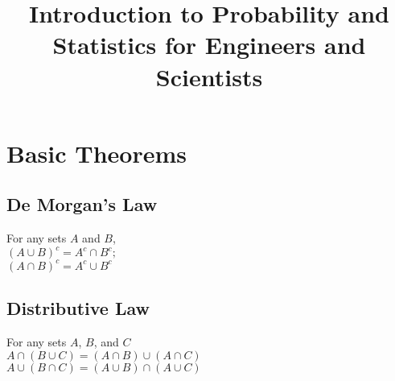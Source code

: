 \documentclass[11pt]{article}
\begin{document}
\title{\textbf{Introduction to Probability and Statistics for Engineers and Scientists}}
\maketitle
\section{Basic Theorems}
\subsection{De Morgan's Law}
\indent For any sets $A$ and $B$, 
\\
$(A\cup B)^c = A^c  \cap B^c; $
\\
$(A \cap B)^c = A^c \cup B^c$
\subsection{Distributive Law}
\indent For any sets $A$, $B$, and $C$ 
\\
$A \cap (B \cup C)=(A \cap B) \cup (A \cap C)$ 
\\
$A \cup (B \cap C)=(A \cup B) \cap (A \cup C)$
\end{document}
